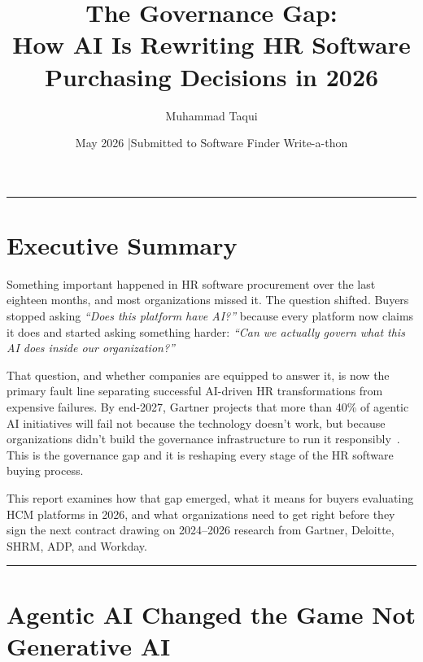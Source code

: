 \documentclass[12pt, a4paper]{article}
\begin{document}
\title{The Governance Gap:\\
  How AI Is Rewriting HR Software Purchasing Decisions in 2026}
\author{Muhammad Taqui}
\date{May 2026 \quad|\quad Submitted to Software Finder Write-a-thon}

\maketitle
\thispagestyle{fancy}

\vspace{-6pt}
\noindent\rule{\linewidth}{0.8pt}
\vspace{4pt}

\section*{Executive Summary}

Something important happened in HR software procurement over the last eighteen months,
and most organizations missed it. The question shifted. Buyers stopped asking
\emph{``Does this platform have AI?''} because every platform now claims it does and
started asking something harder: \emph{``Can we actually govern what this AI does inside
our organization?''}

That question, and whether companies are equipped to answer it, is now the primary fault
line separating successful AI-driven HR transformations from expensive failures. By
end-2027, Gartner projects that more than 40\% of agentic AI initiatives will fail not
because the technology doesn't work, but because organizations didn't build the governance
infrastructure to run it responsibly~\cite{gartner2026}. This is the governance gap and it is reshaping every stage of the HR software buying process.

This report examines how that gap emerged, what it means for buyers evaluating HCM
platforms in 2026, and what organizations need to get right before they sign the next
contract drawing on 2024--2026 research from Gartner, Deloitte, SHRM, ADP, and Workday.

\noindent\rule{\linewidth}{0.4pt}

\section{Agentic AI Changed the Game Not Generative AI}
\end{document}
